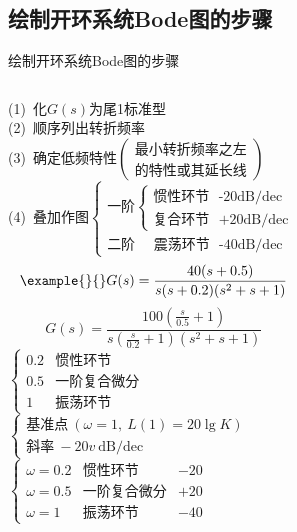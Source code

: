 \documentclass[handout,cjkutf8,table,aspectratio=1610]{beamer} %
\begin{document}
\subsection{绘制开环系统Bode图的步骤}
\begin{frame}{绘制开环系统Bode图的步骤}
	\begin{columns}[T]
			\vs{3em}
			(1)~化$G(s)$为尾1标准型\\\vs{3em}
			(2)~顺序列出转折频率\\\vs{1em}
			(3)~确定低频特性$\left(\begin{matrix}\text{最小转折频率之左}\\ \text{的特性或其延长线
}\end{matrix}\right)$\\
			(4)~叠加作图$\left\{\begin{array}{l}
				\text{一阶}\left\{\begin{array}{l}
					\text{惯性环节~~-20dB/dec}\\
					\text{复合环节~~+20dB/dec}
				\end{array}\right.\\
				\text{二阶~~~~震荡环节~~-40dB/dec}
			\end{array}\right.$
			\vs{-2em}
			$$\text{\example{}{}} G(s) = \frac{40(s  + 0.5)}{s(s+0.2)(s^2+s+1)}$$
			$$G(s) = \frac{100(\frac{s}{0.5}+1)}{s(\frac{s}{0.2}+1)(s^2+s+1)}$$
			$\left\{\begin{array}{cl}
				\text{0.2}&\text{惯性环节}\\
				\text{0.5}&\text{一阶复合微分}\\
				\text{1}&\text{振荡环节}
			\end{array}\right.$\\\vs{1em}
			$\left\{\begin{array}{l}
				\text{基准点}~(\omega=1,~L(1)=20\lg K)\\
				\text{斜率}~-20v~\text{dB/dec}
			\end{array}\right.$\\\vs{1em}
			$\left\{\begin{array}{lll}
				\omega=0.2&\text{惯性环节}&-20\\
				\omega=0.5&\text{一阶复合微分}&+20\\
				\omega=1&\text{振荡环节}&-40
			\end{array}\right.$\\
	\end{columns}
\end{frame}
\end{document}
